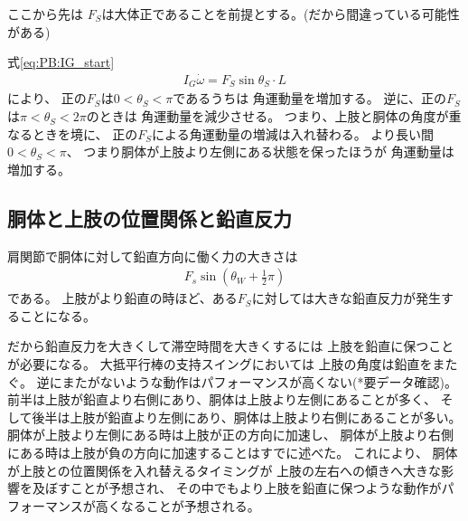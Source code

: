 \documentclass[a4paper,11pt]{jsarticle}
\begin{document}
ここから先は
$F_S$は大体正であることを前提とする。(だから間違っている可能性がある)

式\ref{eq:PB:IG_start}
\begin{align}
  I_G\dot\omega = F_S \sin\theta_S \cdot L
\end{align}
により、
正の$F_S$は$0 < \theta_S < \pi$であるうちは
角運動量を増加する。
逆に、正の$F_S$は$\pi < \theta_S < 2\pi$のときは
角運動量を減少させる。
つまり、上肢と胴体の角度が重なるときを境に、
正の$F_S$による角運動量の増減は入れ替わる。
より長い間$0 < \theta_S < \pi$、
つまり胴体が上肢より左側にある状態を保ったほうが
角運動量は増加する。

\subsection{胴体と上肢の位置関係と鉛直反力}
肩関節で胴体に対して鉛直方向に働く力の大きさは
\begin{align}
  F_s\sin(\theta_W + \frac{1}{2}\pi)
\end{align}
である。
上肢がより鉛直の時ほど、ある$F_S$に対しては大きな鉛直反力が発生することになる。

だから鉛直反力を大きくして滞空時間を大きくするには
上肢を鉛直に保つことが必要になる。
大抵平行棒の支持スイングにおいては
上肢の角度は鉛直をまたぐ。
逆にまたがないような動作はパフォーマンスが高くない(*要データ確認)。
前半は上肢が鉛直より右側にあり、胴体は上肢より左側にあることが多く、
そして後半は上肢が鉛直より左側にあり、胴体は上肢より右側にあることが多い。
胴体が上肢より左側にある時は上肢が正の方向に加速し、
胴体が上肢より右側にある時は上肢が負の方向に加速することはすでに述べた。
これにより、
胴体が上肢との位置関係を入れ替えるタイミングが
上肢の左右への傾きへ大きな影響を及ぼすことが予想され、
その中でもより上肢を鉛直に保つような動作がパフォーマンスが高くなることが予想される。
\end{document}
